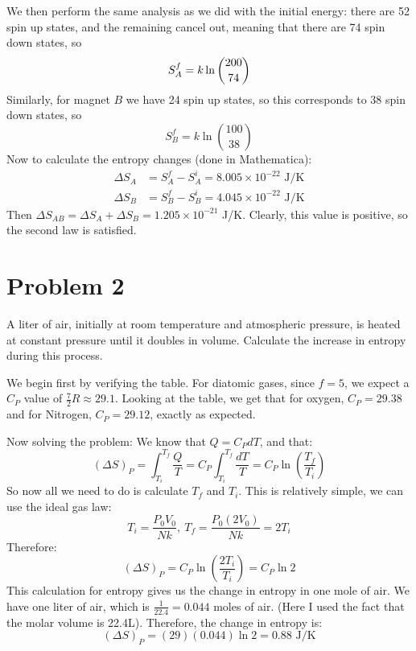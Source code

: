 \documentclass[10pt]{article}
\begin{document}
\begin{enumerate}[label=\alph*)]
\begin{solution}
				We then perform the same analysis as we did with the initial energy: there are 52 spin up
				states, and the remaining cancel 
				out, meaning that there are 74 spin down states, so 
				\[
					S_A^f = k \ln {200 \choose 74}\\
				\] 
				Similarly, for magnet $B$ we have 24 spin up states, so this corresponds to 38 spin down
				states, so 
				\[
					S_B^f = k \ln {100 \choose 38}
				\] 
				Now to calculate the entropy changes (done in Mathematica):
				\begin{align*}
					\Delta S_A &= S_A^f - S_A^i = 8.005 \times 10^{-22} \text{ J/K}\\
					\Delta S_B &= S_B^f - S_B^i = 4.045 \times 10^{-22} \text{ J/K}
				\end{align*}
				Then $\Delta S_{AB} = \Delta S_A + \Delta S_B = 1.205 \times 10^{-21}$ J/K. Clearly, this 
				value is positive, so the second law is satisfied.
			\end{solution}
	\end{enumerate}

	\pagebreak
	\section*{Problem 2}
	A liter of air, initially at room temperature and atmospheric pressure, is heated at constant pressure until 
	it doubles in volume. Calculate the increase in entropy during this process. 

	\begin{solution}
		We begin first by verifying the table. For diatomic gases, since $f = 5$, we expect a $C_P$ value 
		of $\frac{7}{2}R \approx 29.1$. Looking at the table, we get that for oxygen, 
		$C_P = 29.38$ and for Nitrogen, 
		$C_P = 29.12$, exactly as expected. 

		Now solving the problem:  We know that $Q = C_P dT$, and that:
		\[
			(\Delta S)_P = \int_{T_i}^{T_f} \frac{Q}{T} = C_P \int_{T_i}^{T_f} \frac{dT}{T} 
			= C_P \ln \left( \frac{T_f}{T_i} \right) 
		\] 
		So now all we need to do is calculate $T_f$ and $T_i$. This is relatively simple, we can use the 
		ideal gas law:
		\[
		T_i = \frac{P_0V_0}{Nk}, \ T_f = \frac{P_0(2V_0)}{Nk} = 2T_i
		\] 
		Therefore:
		\[
			(\Delta S)_P = C_P \ln \left( \frac{2T_i}{T_i} \right) = C_P \ln 2
		\] 
		This calculation for entropy gives us the change in entropy in one mole of air. We have one liter
		of air, which is $\frac{1}{22.4} = 0.044$ moles of air. (Here I used the fact that the molar volume
		is 22.4L). Therefore, the change in entropy is: 
		\[
			(\Delta S)_P = (29)(0.044)\ln 2 = 0.88 \text{ J/K}
		\] 
	\end{solution}
	\pagebreak
\end{document}

